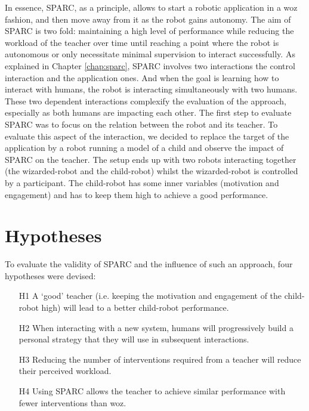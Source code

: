 In essence, SPARC, as a principle, allows to start a robotic application in a \gls{woz} fashion, and then move away from it as the robot gains autonomy. The aim of SPARC is two fold: maintaining a high level of performance while reducing the workload of the teacher over time until reaching a point where the robot is autonomous or only necessitate minimal supervision to interact successfully. As explained in Chapter \ref{chap:sparc}, SPARC involves two interactions the control interaction and the application ones. And when the goal is learning how to interact with humans, the robot is interacting simultaneously with two humans. These two dependent interactions complexify the evaluation of the approach, especially as both humans are impacting each other. The first step to evaluate SPARC was to focus on the relation between the robot and its teacher. To evaluate this aspect of the interaction, we decided to replace the target of the application by a robot running a model of a child and observe the impact of SPARC on the teacher. The setup ends up with two robots interacting together (the wizarded-robot and the child-robot) whilst the wizarded-robot is controlled by a participant. The child-robot has some inner variables (motivation and engagement) and has to keep them high to achieve a good performance.


\section{Hypotheses}


To evaluate the validity of SPARC and the influence of such an approach, four hypotheses were devised:
\begin{enumerate}
	\item [H1] A `good' teacher (i.e. keeping the motivation and engagement of the child-robot high) will lead to a better child-robot performance.
	\item [H2] When interacting with a new system, humans will progressively build a personal strategy that they will use in subsequent interactions.
	\item [H3] Reducing the number of interventions required from a teacher will reduce their perceived workload.
	\item [H4] Using SPARC allows the teacher to achieve similar performance with fewer interventions than \gls{woz}.
\end{enumerate}

